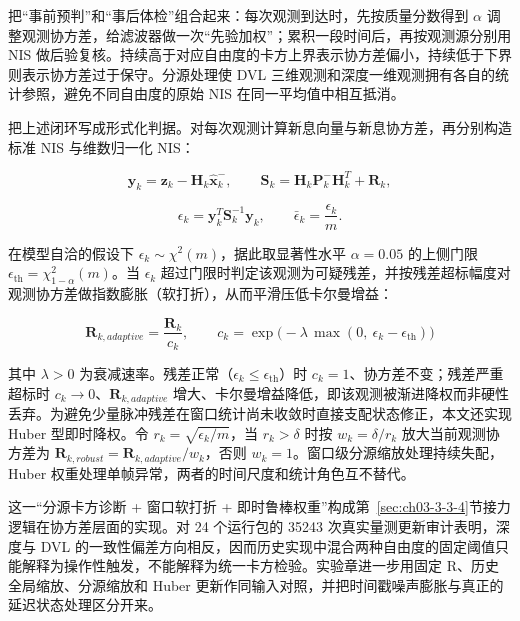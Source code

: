 把``事前预判''和``事后体检''组合起来：每次观测到达时，先按质量分数得到 \(\alpha\) 调整观测协方差，给滤波器做一次``先验加权''；累积一段时间后，再按观测源分别用 NIS 做后验复核。持续高于对应自由度的卡方上界表示协方差偏小，持续低于下界则表示协方差过于保守。分源处理使 DVL 三维观测和深度一维观测拥有各自的统计参照，避免不同自由度的原始 NIS 在同一平均值中相互抵消。

把上述闭环写成形式化判据。对每次观测计算新息向量与新息协方差，再分别构造标准 NIS 与维数归一化 NIS：

\begin{equation}
\boldsymbol{y}_k = \boldsymbol{z}_k - \boldsymbol{H}_k\hat{\boldsymbol{x}}_k^-, \qquad \boldsymbol{S}_k = \boldsymbol{H}_k\boldsymbol{P}_k^-\boldsymbol{H}_k^T + \boldsymbol{R}_k,
\label{eq:ch03-nis-innovation}
\end{equation}

\begin{equation}
\epsilon_k=\boldsymbol{y}_k^T\boldsymbol{S}_k^{-1}\boldsymbol{y}_k,\qquad \bar{\epsilon}_k=\frac{\epsilon_k}{m}.
\label{eq:ch03-nis-def}
\end{equation}

在模型自洽的假设下 \(\epsilon_k\sim\chi^2(m)\)，据此取显著性水平 \(\alpha=0.05\) 的上侧门限 \(\epsilon_{\mathrm{th}}=\chi^2_{1-\alpha}(m)\)。当 \(\epsilon_k\) 超过门限时判定该观测为可疑残差，并按残差超标幅度对观测协方差做指数膨胀（软打折），从而平滑压低卡尔曼增益\cite{piche2016online,chen2023kalman}：

\begin{equation}
\boldsymbol{R}_{k,adaptive} = \frac{\boldsymbol{R}_k}{c_k}, \qquad c_k = \exp\!\big(-\lambda\,\max(0,\ \epsilon_k-\epsilon_{\mathrm{th}})\big)
\label{eq:ch03-nis-softdiscount}
\end{equation}

其中 \(\lambda > 0\) 为衰减速率。残差正常（\(\epsilon_k\le\epsilon_{\mathrm{th}}\)）时 \(c_k=1\)、协方差不变；残差严重超标时 \(c_k\to0\)、\(\boldsymbol{R}_{k,adaptive}\) 增大、卡尔曼增益降低，即该观测被渐进降权而非硬性丢弃。为避免少量脉冲残差在窗口统计尚未收敛时直接支配状态修正，本文还实现 Huber 型即时降权。令 \(r_k=\sqrt{\epsilon_k/m}\)，当 \(r_k>\delta\) 时按 \(w_k=\delta/r_k\) 放大当前观测协方差为 \(\boldsymbol{R}_{k,robust}=\boldsymbol{R}_{k,adaptive}/w_k\)，否则 \(w_k=1\)。窗口级分源缩放处理持续失配，Huber 权重处理单帧异常，两者的时间尺度和统计角色互不替代。

这一``分源卡方诊断 + 窗口软打折 + 即时鲁棒权重''构成第~\ref{sec:ch03-3-3-4}节接力逻辑在协方差层面的实现。对 24 个运行包的 35243 次真实量测更新审计表明，深度与 DVL 的一致性偏差方向相反，因而历史实现中混合两种自由度的固定阈值只能解释为操作性触发，不能解释为统一卡方检验。实验章进一步用固定 R、历史全局缩放、分源缩放和 Huber 更新作同输入对照，并把时间戳噪声膨胀与真正的延迟状态处理区分开来。

